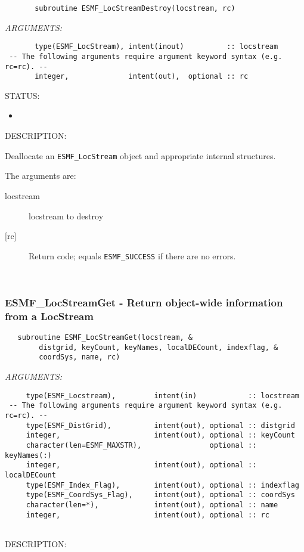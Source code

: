  
\begin{verbatim}       subroutine ESMF_LocStreamDestroy(locstream, rc)\end{verbatim}{\em ARGUMENTS:}
\begin{verbatim}       type(ESMF_LocStream), intent(inout)          :: locstream 
 -- The following arguments require argument keyword syntax (e.g. rc=rc). --
       integer,              intent(out),  optional :: rc\end{verbatim}
{\sf STATUS:}
   \begin{itemize}
   \item{}
   \end{itemize}
  
{\sf DESCRIPTION:\\ }


       Deallocate an {\tt ESMF\_LocStream} object and appropriate 
       internal structures.
  
       The arguments are:
       \begin{description}
       \item[locstream]
            locstream to destroy
       \item[{[rc]}]
            Return code; equals {\tt ESMF\_SUCCESS} if there are no errors.
     \end{description}
   
 
\mbox{}\hrulefill\ 
 
\subsubsection [ESMF\_LocStreamGet] {ESMF\_LocStreamGet - Return object-wide information from a LocStream}


 
\begin{verbatim}   subroutine ESMF_LocStreamGet(locstream, &
        distgrid, keyCount, keyNames, localDECount, indexflag, &
        coordSys, name, rc)\end{verbatim}{\em ARGUMENTS:}
\begin{verbatim}     type(ESMF_Locstream),         intent(in)            :: locstream
 -- The following arguments require argument keyword syntax (e.g. rc=rc). --
     type(ESMF_DistGrid),          intent(out), optional :: distgrid
     integer,                      intent(out), optional :: keyCount
     character(len=ESMF_MAXSTR),                optional :: keyNames(:) 
     integer,                      intent(out), optional :: localDECount
     type(ESMF_Index_Flag),        intent(out), optional :: indexflag
     type(ESMF_CoordSys_Flag),     intent(out), optional :: coordSys
     character(len=*),             intent(out), optional :: name
     integer,                      intent(out), optional :: rc
 
 \end{verbatim}
{\sf DESCRIPTION:\\ }


